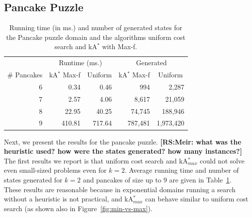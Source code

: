 \documentclass{aicom2e}
\newcommand{\kastar}{kA$^*$}
\newcommand{\kastarmax}{kA$^*_{max}$}
\newcommand{\maxf}{Max-f}
\newcommand{\roni}[1]{\textbf{[RS:#1]}}
\begin{document}
\subsection{Pancake Puzzle}

\begin{table}[]
	\centering
	\begin{tabular}{r|rr|rr}
		\multicolumn{1}{l|}{}            & \multicolumn{2}{c|}{Runtime (ms.)}                                       & \multicolumn{2}{c}{Generated}                                           \\
		\multicolumn{1}{c|}{\# Pancakes} & \multicolumn{1}{c}{\kastar{} \maxf{}} & \multicolumn{1}{c|}{Uniform} & \multicolumn{1}{c}{\kastar{} \maxf{}} & \multicolumn{1}{c}{Uniform} \\ \hline
		6                               & 0.34                                      & 0.46                        & 994                                       & 2,287                       \\
		7                               & 2.57                                      & 4.06                        & 8,617                                     & 21,059                      \\
		8                               & 22.95                                     & 40.25                       & 74,745                                    & 188,946                     \\
		9                               & 410.81                                    & 717.64                      & 787,481                                   & 1,973,420                  
	\end{tabular}
	\caption{Running time (in ms.) and number of generated states for the Pancake puzzle domain and the algorithms uniform cost search and \kastar{} with \maxf{}.}
\label{tab:pancake-max-uniform}
\end{table}

Next, we present the results for the pancake puzzle. 
\roni{Meir: what was the heuristic used? how were the states generated? how many instances?}
The first results we report is that uniform cost search and \kastarmax{} 
could not solve even small-sized problems even for $k=2$. Average running time and number of states generated  for $k=2$ and pancakes of size up to 9 are given in Table~\ref{tab:pancake-max-uniform}. These results are reasonable because in exponential domains running a search without a heuristic is not practical, and \kastarmax{} can behave similar to uniform cost search (as shown also in Figure~\ref{fig:min-vs-max}). 
\end{document}
